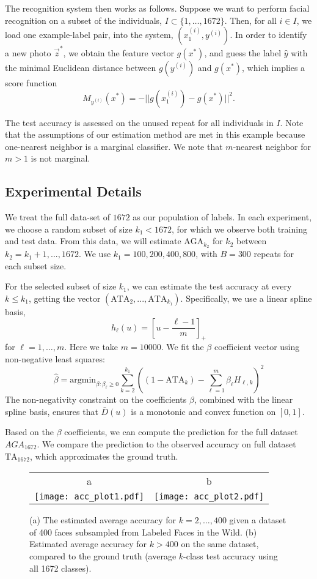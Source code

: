 \documentclass[twoside,11pt]{article}
\newcommand{\argmin}{\text{argmin}}
\begin{document}
The recognition system then works as follows.  Suppose we want to
perform facial recognition on a subset of the individuals, $I \subset
\{1,\hdots, 1672\}$.  Then, for all $i \in I$, we load one example-label pair, into the system, $(x_1^{(i)}, y^{(i)})$.  In
order to identify a new photo $\vec{z}^*$, we obtain the feature
vector $g(x^*)$, and guess the label $\hat{y}$
with the minimal Euclidean distance between $g(y^{(i)})$ and $g(x^*)$,
which implies a score function
\[
M_{y^{(i)}}(x^*) = -||g(x_1^{(i)}) - g(x^*)||^2.
\]


The test accuracy is assessed on the unused repeat for all individuals
in $I$.  Note that the assumptions of our estimation method are met in
this example because one-nearest neighbor is a marginal classifier.
We note that $m$-nearest neighbor for $m > 1$ is not marginal.

\subsection{Experimental Details}
We treat the full data-set of $1672$ as our population of labels. In each experiment, we choose a random subset of size $k_1<1672$, for which we observe both training and test data. From this data, we will estimate $\text{AGA}_{k_2}$ for $k_2$ between $k_2 = k_1+1,...,1672$. We use $k_1 = 100,200,400,800$, with $B = 300$ repeats for each subset size.

For the selected subset of size $k_1$, we can estimate the test accuracy at every $k \leq k_1$, getting the vector $(\text{ATA}_2,...,\text{ATA}_{k_1})$.
Specifically, we use a linear
spline basis,
\[
h_\ell(u) = \left[u - \frac{\ell - 1}{m}\right]_+
\]
for $\ell = 1,\hdots, m$.  Here we take $m = 10000$. 
We fit the $\beta$ coefficient vector using non-negative least squares: 
\[
\hat{\beta} = \argmin_{\beta: \beta_\ell \geq 0} \sum_{k=2}^{k_1} \left( (1 - \text{ATA}_k) - \sum_{\ell=1}^m \beta_\ell H_{\ell, k}\right)^2
\]
The non-negativity constraint on the
coefficients $\beta$, combined with the linear spline basis, ensures
that $\bar{D}(u)$ is a monotonic and convex function on $[0,1]$. 

Based on the $\beta$ coefficients, we can compute the prediction for the full dataset $\hat{AGA}_{1672}$.
We compare the prediction to the observed accuracy on full dataset $\text{TA}_{1672}$, which approximates the ground truth.


\begin{figure}
\centering
\begin{tabular}{cc}
a & b\\
\texttt{[image: acc\_plot1.pdf]} &
\texttt{[image: acc\_plot2.pdf]}
\end{tabular}
\caption{(a) The estimated average accuracy for $k = 2,\hdots,
  400$ given a dataset of 400 faces subsampled from Labeled Faces in
  the Wild.  (b) Estimated average accuracy for $k > 400$ on the
  same dataset, compared to the ground truth (average $k$-class test accuracy
  using all 1672 classes).}
\label{fig:lfw_extrapolation1}
\end{figure}
\end{document}
